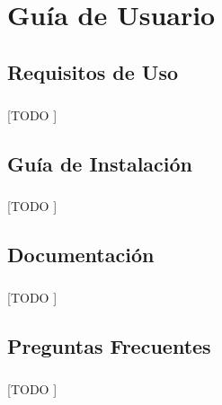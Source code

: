 \documentclass{subfiles}
\begin{document}
  \chapter{Guía de Usuario}
  \label{chap:user_guide}

    \section{Requisitos de Uso}
    \label{sec:user_guide_requirements}

      \paragraph{}
      [TODO ]

    \section{Guía de Instalación}
    \label{sec:user_guide_install}

      \paragraph{}
      [TODO ]

    \section{Documentación}
    \label{sec:user_guide_documentation}

      \paragraph{}
      [TODO ]

    \section{Preguntas Frecuentes}
    \label{sec:user_guide_faq}

      \paragraph{}
      [TODO ]
\end{document}

